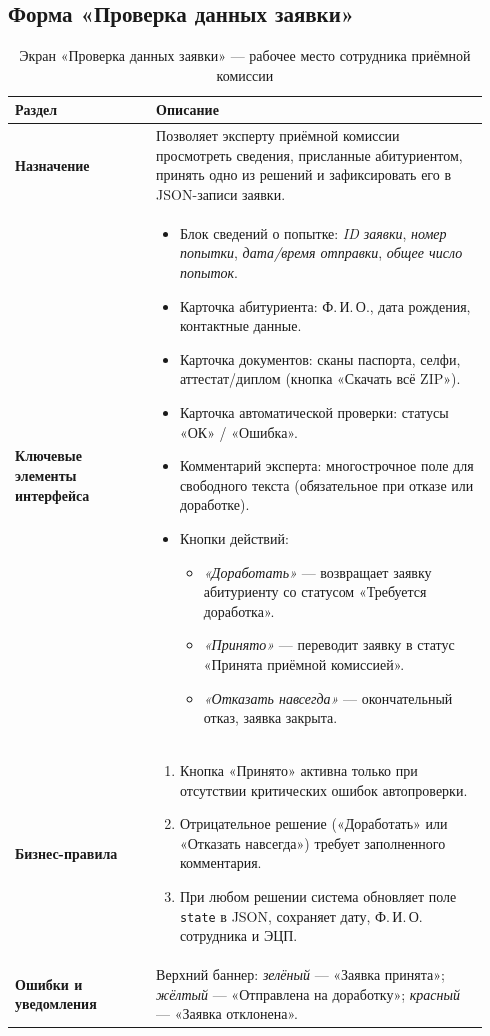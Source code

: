 \documentclass[areasetadvanced]{scrartcl}
\begin{document}
\subsection{Форма «Проверка данных заявки»}
\begin{table}[H]
\caption{Экран «Проверка данных заявки» — рабочее место сотрудника приёмной комиссии}
\renewcommand{\arraystretch}{1.2}
\begin{tabular}{|p{0.28\linewidth}|p{0.66\linewidth}|}
\hline
\textbf{Раздел} & \textbf{Описание} \\ \hline
\textbf{Назначение} &
Позволяет эксперту приёмной комиссии просмотреть сведения, присланные абитуриентом, принять одно из решений и зафиксировать его в JSON-записи заявки. \\ \hline

\textbf{Ключевые элементы интерфейса} &
\begin{itemize}
  \item Блок сведений о попытке: \emph{ID заявки}, \emph{номер попытки}, \emph{дата/время отправки}, \emph{общее число попыток}.
  \item Карточка абитуриента: Ф.\,И.\,О., дата рождения, контактные данные.
  \item Карточка документов: сканы паспорта, селфи, аттестат/диплом (кнопка «Скачать всё ZIP»).
  \item Карточка автоматической проверки: статусы «ОК» / «Ошибка».
  \item Комментарий эксперта: многострочное поле для свободного текста (обязательное при отказе или доработке).
  \item Кнопки действий:
        \begin{itemize}
          \item \emph{«Доработать»} — возвращает заявку абитуриенту со статусом «Требуется доработка».
          \item \emph{«Принято»} — переводит заявку в статус «Принята приёмной комиссией».
          \item \emph{«Отказать навсегда»} — окончательный отказ, заявка закрыта.
        \end{itemize}
\end{itemize} \\ \hline

\textbf{Бизнес-правила} &
\begin{enumerate}
  \item Кнопка «Принято» активна только при отсутствии критических ошибок автопроверки.
  \item Отрицательное решение («Доработать» или «Отказать навсегда») требует заполненного комментария.
  \item При любом решении система обновляет поле \texttt{state} в JSON, сохраняет дату, Ф.\,И.\,О. сотрудника и ЭЦП.
\end{enumerate} \\ \hline

\textbf{Ошибки и уведомления} &
Верхний баннер: \emph{зелёный} — «Заявка принята»; \emph{жёлтый} — «Отправлена на доработку»; \emph{красный} — «Заявка отклонена». \\ \hline
\end{tabular}
\end{table}
\end{document}
